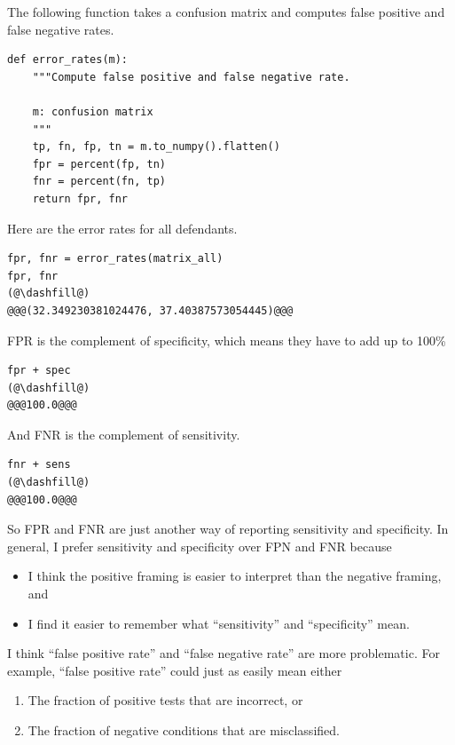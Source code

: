 The following function takes a confusion matrix and computes false
positive and false negative rates.

\begin{lstlisting}[]
def error_rates(m):
    """Compute false positive and false negative rate.
    
    m: confusion matrix
    """
    tp, fn, fp, tn = m.to_numpy().flatten()
    fpr = percent(fp, tn)
    fnr = percent(fn, tp)
    return fpr, fnr
\end{lstlisting}

Here are the error rates for all defendants.

\begin{lstlisting}[]
fpr, fnr = error_rates(matrix_all)
fpr, fnr
(@\dashfill@)
@@@(32.349230381024476, 37.40387573054445)@@@
\end{lstlisting}

FPR is the complement of specificity, which means they have to add up to
100\%

\begin{lstlisting}[]
fpr + spec
(@\dashfill@)
@@@100.0@@@
\end{lstlisting}

And FNR is the complement of sensitivity.

\begin{lstlisting}[]
fnr + sens
(@\dashfill@)
@@@100.0@@@
\end{lstlisting}

So FPR and FNR are just another way of reporting sensitivity and
specificity. In general, I prefer sensitivity and specificity over FPN
and FNR because

\begin{itemize}
\item
  I think the positive framing is easier to interpret than the negative
  framing, and
\item
  I find it easier to remember what ``sensitivity'' and ``specificity''
  mean.
\end{itemize}

I think ``false positive rate'' and ``false negative rate'' are more
problematic. For example, ``false positive rate'' could just as easily
mean either

\begin{enumerate}
\def\labelenumi{\arabic{enumi}.}
\item
  The fraction of positive tests that are incorrect, or
\item
  The fraction of negative conditions that are misclassified.
\end{enumerate}

